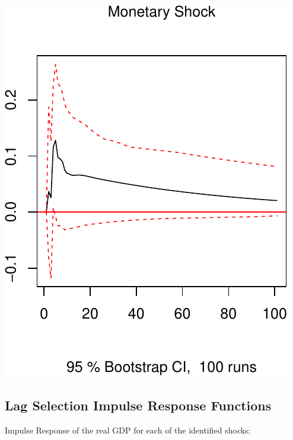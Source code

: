 \documentclass[11pt,preprint, authoryear]{elsarticle}
\numberwithin{equation}{section}
\numberwithin{figure}{section}
\numberwithin{table}{section}
\begin{document}
\includegraphics{TS_proj_files/figure-latex/unnamed-chunk-38-3.pdf}

\newpage

\hypertarget{lag-selection-impulse-response-functions}{%
\subsection{Lag Selection Impulse Response
Functions}\label{lag-selection-impulse-response-functions}}

Impulse Response of the real GDP for each of the identified shocks:
\end{document}

